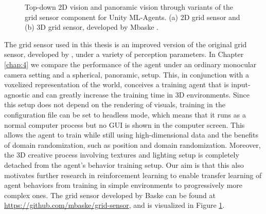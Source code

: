 \begin{figure}[!ht]
    \centering
        \caption{
            Top-down 2D vision and panoramic vision through variants of the grid sensor component for Unity ML-Agents. (a) 2D grid sensor and (b) 3D grid sensor, developed by Mbaske \cite{github-mbaske-gridsensor}.
        }
        \label{fig:gridsensor-3d}
\end{figure}

The grid sensor used in this thesis is an improved version of the original grid sensor, developed by \textcite{github-mbaske-gridsensor}, under a variety of perception parameters. 
In Chapter \ref{chap:4} we compare the performance of the agent under an ordinary monocular camera setting and a spherical, panoramic, setup. 
This, in conjunction with a voxelized representation of the world, conceives a training agent that is input-agnostic and can greatly increase the training time in 3D environments. 
Since this setup does not depend on the rendering of visuals, training in the configuration file can be set to headless mode, which means that it runs as a normal computer process but no GUI is shown in the computer screen. This allows the agent to train while still using high-dimensional data and the benefits of domain randomization, such as position and domain randomization. Moreover, the 3D creative process involving textures and lighting setup is completely detached from the agent's behavior training setup. 
Our aim is that this also motivates further research in reinforcement learning to enable transfer learning of agent behaviors from training in simple environments to progressively more complex ones. 
The grid sensor developed by Baske can be found at \url{https://github.com/mbaske/grid-sensor}, and is visualized in Figure \ref{fig:gridsensor-3d}. 


